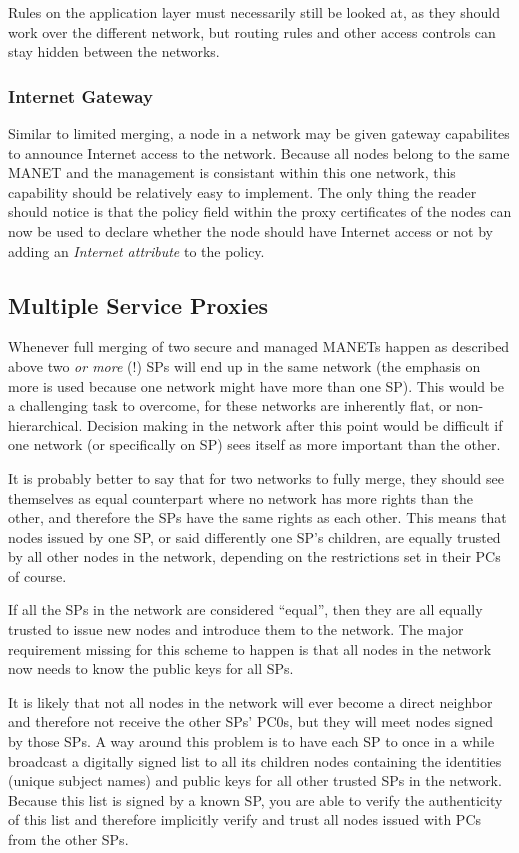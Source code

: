 Rules on the application layer must necessarily still be looked at, as they
should work over the different network, but routing rules and other access
controls can stay hidden between the networks.

\subsubsection*{Internet Gateway}
Similar to limited merging, a node in a network may be given gateway capabilites
to announce Internet access to the network. Because all nodes belong to the same
\ac{MANET} and the management is consistant within this one network, this
capability should be relatively easy to implement. The only thing the reader
should notice is that the policy field within the proxy certificates of the
nodes can now be used to declare whether the node should have Internet access or
not by adding an \emph{Internet attribute} to the policy.

\subsection{Multiple Service Proxies}
Whenever full merging of two secure and managed MANETs happen as described above
two \emph{or more} (!) SPs will end up in the same network (the emphasis on more
is used because one network might have more than one SP). This would be a
challenging task to overcome, for these networks are inherently flat, or
non-hierarchical. Decision making in the network after this point would be
difficult if one network (or specifically on SP) sees itself as more important
than the other.

It is probably better to say that for two networks to fully merge, they should
see themselves as equal counterpart where no network has more rights than the
other, and therefore the \acp{SP} have the same rights as each other. This means
that nodes issued by one \ac{SP}, or said differently one SP's children, are
equally trusted by all other nodes in the network, depending on the restrictions
set in their \acp{PC} of course.

If all the \acp{SP} in the network are considered ``equal'', then they are all
equally trusted to issue new nodes and introduce them to the network. The major
requirement missing for this scheme to happen is that all nodes in the network
now needs to know the public keys for all SPs.

It is likely that not all nodes in the network will ever become a direct
neighbor and therefore not receive the other SPs' \acp{PC0}, but they will meet
nodes signed by those SPs. A way around this problem is to have each \ac{SP} to
once in a while broadcast a digitally signed list to all its children nodes
containing the identities (unique subject names) and public keys for all other
trusted \acp{SP} in the network. Because this list is signed by a known
\ac{SP}, you are able to verify the authenticity of this list and therefore
implicitly verify and trust all nodes issued with PCs from the other SPs.

